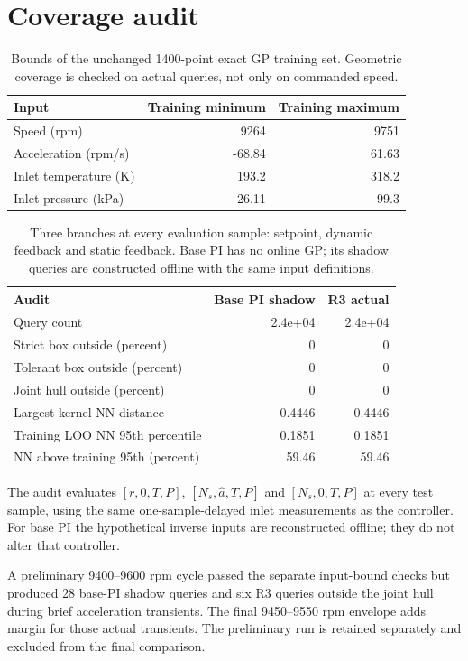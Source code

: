 \documentclass[11pt,a4paper]{article}
\begin{document}
\section{Coverage audit}
\begin{table}[H]\centering\small\begin{tabular}{lrr}\toprule
Input & Training minimum & Training maximum\\\midrule
Speed (rpm) & 9264 & 9751\\
Acceleration (rpm/s) & -68.84 & 61.63\\
Inlet temperature (K) & 193.2 & 318.2\\
Inlet pressure (kPa) & 26.11 & 99.3\\
\bottomrule\end{tabular}\caption{Bounds of the unchanged 1400-point exact GP training set. Geometric coverage is checked on actual queries, not only on commanded speed.}\end{table}
\begin{table}[H]\centering\small\begin{tabular}{lrr}\toprule
Audit & Base PI shadow & R3 actual\\\midrule
Query count & 2.4e+04 & 2.4e+04\\
Strict box outside (percent) & 0 & 0\\
Tolerant box outside (percent) & 0 & 0\\
Joint hull outside (percent) & 0 & 0\\
Largest kernel NN distance & 0.4446 & 0.4446\\
Training LOO NN 95th percentile & 0.1851 & 0.1851\\
NN above training 95th (percent) & 59.46 & 59.46\\
\bottomrule\end{tabular}\caption{Three branches at every evaluation sample: setpoint, dynamic feedback and static feedback. Base PI has no online GP; its shadow queries are constructed offline with the same input definitions.}\end{table}
The audit evaluates $[r,0,T,P]$, $[N_s,\hat a,T,P]$ and $[N_s,0,T,P]$ at every test sample, using the same one-sample-delayed inlet measurements as the controller. For base PI the hypothetical inverse inputs are reconstructed offline; they do not alter that controller.

A preliminary 9400--9600 rpm cycle passed the separate input-bound checks but produced 28 base-PI shadow queries and six R3 queries outside the joint hull during brief acceleration transients. The final 9450--9550 rpm envelope adds margin for those actual transients. The preliminary run is retained separately and excluded from the final comparison.
\end{document}

